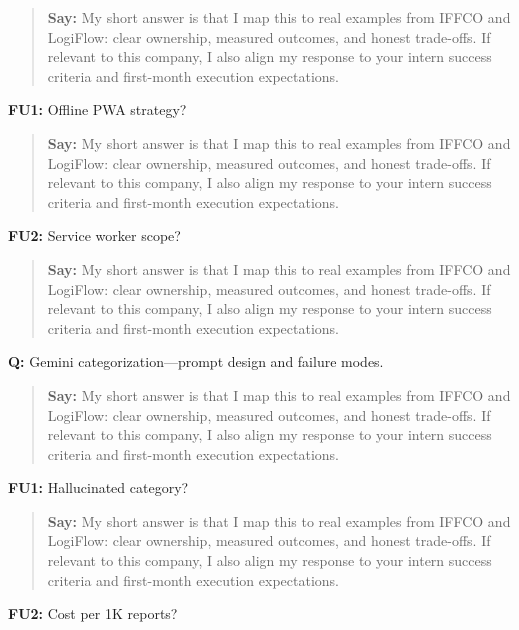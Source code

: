 \documentclass[9pt,a4paper]{article}
\begin{document}
\begin{quote}\small\textbf{Say:} My short answer is that I map this to real examples from IFFCO and LogiFlow: clear ownership, measured outcomes, and honest trade-offs. If relevant to this company, I also align my response to your intern success criteria and first-month execution expectations.\end{quote}
\vspace{2mm}
\textbf{FU1:} Offline PWA strategy?

\begin{quote}\small\textbf{Say:} My short answer is that I map this to real examples from IFFCO and LogiFlow: clear ownership, measured outcomes, and honest trade-offs. If relevant to this company, I also align my response to your intern success criteria and first-month execution expectations.\end{quote}
\vspace{2mm}
\textbf{FU2:} Service worker scope?

\begin{quote}\small\textbf{Say:} My short answer is that I map this to real examples from IFFCO and LogiFlow: clear ownership, measured outcomes, and honest trade-offs. If relevant to this company, I also align my response to your intern success criteria and first-month execution expectations.\end{quote}
\vspace{2mm}
\textbf{Q:} Gemini categorization---prompt design and failure modes.

\begin{quote}\small\textbf{Say:} My short answer is that I map this to real examples from IFFCO and LogiFlow: clear ownership, measured outcomes, and honest trade-offs. If relevant to this company, I also align my response to your intern success criteria and first-month execution expectations.\end{quote}
\vspace{2mm}
\textbf{FU1:} Hallucinated category?

\begin{quote}\small\textbf{Say:} My short answer is that I map this to real examples from IFFCO and LogiFlow: clear ownership, measured outcomes, and honest trade-offs. If relevant to this company, I also align my response to your intern success criteria and first-month execution expectations.\end{quote}
\vspace{2mm}
\textbf{FU2:} Cost per 1K reports?
\end{document}
